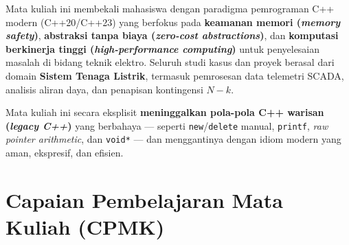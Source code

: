 \documentclass[12pt,a4paper]{article}
\begin{document}
\begin{tcolorbox}[colback=lightblue, colframe=uniblue, title={\textbf{Deskripsi}}, fonttitle=\bfseries]
Mata kuliah ini membekali mahasiswa dengan paradigma pemrograman C++ modern (C++20/C++23) yang berfokus pada \textbf{keamanan memori (\textit{memory safety})}, \textbf{abstraksi tanpa biaya (\textit{zero-cost abstractions})}, dan \textbf{komputasi berkinerja tinggi (\textit{high-performance computing})} untuk penyelesaian masalah di bidang teknik elektro. Seluruh studi kasus dan proyek berasal dari domain \textbf{Sistem Tenaga Listrik}, termasuk pemrosesan data telemetri SCADA, analisis aliran daya, dan penapisan kontingensi $N-k$.

Mata kuliah ini secara eksplisit \textbf{meninggalkan pola-pola C++ warisan (\textit{legacy C++})} yang berbahaya --- seperti \texttt{new}/\texttt{delete} manual, \texttt{printf}, \textit{raw pointer arithmetic}, dan \texttt{void*} --- dan menggantinya dengan idiom modern yang aman, ekspresif, dan efisien.
\end{tcolorbox}

\section*{Capaian Pembelajaran Mata Kuliah (CPMK)}
\end{document}

